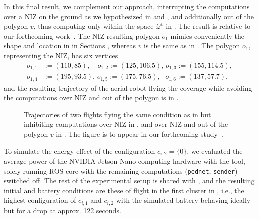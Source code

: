 In this final result, we complement our approach, interrupting the computations over a NIZ on the ground as we hypothesized in  and , and additionally out of the polygon $v$, thus computing only within the space $\mathcal{Q}^v$ in . The result is relative to our forthcoming work~\citep{seewald202Xenergy}. The NIZ resulting polygon $o_1$ mimics conveniently the shape and location in  in Sections , whereas $v$ is the same as in . The polygon $o_1$, representing the NIZ, has six vertices
\begin{equation}\begin{split}
  o_{1,1}&:=(110,85),\,\,\,\,\,\,o_{1,2}:=(125,106.5),\,o_{1,3}:=(155,114.5),\\
  o_{1,4}&:=(195,93.5),\,o_{1,5}:=(175,76.5),\,\,\,\,o_{1,6}:=(137,57.7),
\end{split}\end{equation}
and the resulting trajectory of the aerial robot flying the coverage while avoiding the computations over NIZ and out of the polygon is in .
\begin{figure}[h!]
  \centering
  \selectfont
  \footnotesize    
  
  \caption[The trajectory effect of inhibiting computations over NIZ and out of the polygon]{Trajectories of two flights flying the same condition as  in  but inhibiting computations over NIZ in , and over NIZ and out of the polygon $v$ in . The figure is to appear in our forthcoming study~\citep{seewald202Xenergy}.}
  \label{fig:trajs-niz}
\end{figure}
To simulate the energy effect of the configuration $c_{i,2}=\{0\}$, we evaluated the average power of the NVIDIA Jetson Nano computing hardware with the \powprof{} tool, solely running ROS core with the remaining computations ({\small\tt pednet}, {\small\tt sender}) switched off. The rest of the experimental setup is shared with , and the resulting initial and battery conditions are these of flight  in the first cluster in , i.e., the highest configuration of $c_{i,1}$ and $c_{i,2}$ with the simulated battery behaving ideally but for a drop at approx. 122 seconds.

